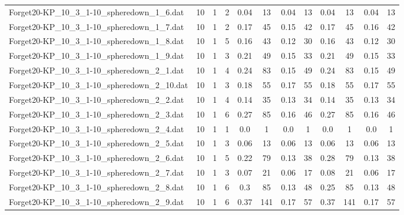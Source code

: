 \begin{sidewaystable}[!ht]
{\begin{tabular}{lccccccccccc}
Forget20-KP\_10\_3\_1-10\_spheredown\_1\_6.dat & 10 & 1 & 2 &  \textcolor{blue2}{0.04} & 13 &  \textcolor{blue2}{0.04} & 13 &  \textcolor{blue2}{0.04} & 13 &  \textcolor{blue2}{0.04} & 13 \\
Forget20-KP\_10\_3\_1-10\_spheredown\_1\_7.dat & 10 & 1 & 2 & 0.17 & 45 &  \textcolor{blue2}{0.15} & 42 & 0.17 & 45 & 0.16 & 42 \\
Forget20-KP\_10\_3\_1-10\_spheredown\_1\_8.dat & 10 & 1 & 5 & 0.16 & 43 &  \textcolor{blue2}{0.12} & 30 & 0.16 & 43 &  \textcolor{blue2}{0.12} & 30 \\
Forget20-KP\_10\_3\_1-10\_spheredown\_1\_9.dat & 10 & 1 & 3 & 0.21 & 49 &  \textcolor{blue2}{0.15} & 33 & 0.21 & 49 &  \textcolor{blue2}{0.15} & 33 \\
Forget20-KP\_10\_3\_1-10\_spheredown\_2\_1.dat & 10 & 1 & 4 & 0.24 & 83 &  \textcolor{blue2}{0.15} & 49 & 0.24 & 83 &  \textcolor{blue2}{0.15} & 49 \\
Forget20-KP\_10\_3\_1-10\_spheredown\_2\_10.dat & 10 & 1 & 3 & 0.18 & 55 &  \textcolor{blue2}{0.17} & 55 & 0.18 & 55 &  \textcolor{blue2}{0.17} & 55 \\
Forget20-KP\_10\_3\_1-10\_spheredown\_2\_2.dat & 10 & 1 & 4 & 0.14 & 35 &  \textcolor{blue2}{0.13} & 34 & 0.14 & 35 &  \textcolor{blue2}{0.13} & 34 \\
Forget20-KP\_10\_3\_1-10\_spheredown\_2\_3.dat & 10 & 1 & 6 & 0.27 & 85 &  \textcolor{blue2}{0.16} & 46 & 0.27 & 85 &  \textcolor{blue2}{0.16} & 46 \\
Forget20-KP\_10\_3\_1-10\_spheredown\_2\_4.dat & 10 & 1 & 1 &  \textcolor{blue2}{0.0} & 1 &  \textcolor{blue2}{0.0} & 1 &  \textcolor{blue2}{0.0} & 1 &  \textcolor{blue2}{0.0} & 1 \\
Forget20-KP\_10\_3\_1-10\_spheredown\_2\_5.dat & 10 & 1 & 3 &  \textcolor{blue2}{0.06} & 13 &  \textcolor{blue2}{0.06} & 13 &  \textcolor{blue2}{0.06} & 13 &  \textcolor{blue2}{0.06} & 13 \\
Forget20-KP\_10\_3\_1-10\_spheredown\_2\_6.dat & 10 & 1 & 5 & 0.22 & 79 &  \textcolor{blue2}{0.13} & 38 & 0.28 & 79 &  \textcolor{blue2}{0.13} & 38 \\
Forget20-KP\_10\_3\_1-10\_spheredown\_2\_7.dat & 10 & 1 & 3 & 0.07 & 21 &  \textcolor{blue2}{0.06} & 17 & 0.08 & 21 &  \textcolor{blue2}{0.06} & 17 \\
Forget20-KP\_10\_3\_1-10\_spheredown\_2\_8.dat & 10 & 1 & 6 & 0.3 & 85 &  \textcolor{blue2}{0.13} & 48 & 0.25 & 85 &  \textcolor{blue2}{0.13} & 48 \\
Forget20-KP\_10\_3\_1-10\_spheredown\_2\_9.dat & 10 & 1 & 6 & 0.37 & 141 &  \textcolor{blue2}{0.17} & 57 & 0.37 & 141 &  \textcolor{blue2}{0.17} & 57 \\

\end{tabular}}
\end{sidewaystable}
